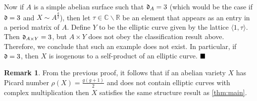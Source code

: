 \documentclass[11pt,leqno]{article}
\theoremstyle{definition}
\newtheorem{remark}{Remark}[section]
\begin{document}
Now if $A$ is a simple abelian surface such that $\frak{d}_A=3$ (which would be the case if $\frak{d}=3$ and $X\sim A^{\frac{g}{2}}$), then let $\tau\in\mathbb{C}\backslash\mathbb{R}$ be an element that appears as an entry in a period matrix of $A$. Define $Y$ to be the elliptic curve given by the lattice $\langle 1,\tau\rangle$. Then $\frak{d}_{A\times Y}=3$, but $A\times Y$ does not obey the classification result above. Therefore, we conclude that such an example does not exist. In particular, if $\frak{d}=3$, then $X$ is isogenous to a self-product of an elliptic curve.
$\hfill \blacksquare$\\

\begin{remark}
From the previous proof, it follows that if an abelian variety $X$ has Picard number $\rho(X)=\frac{g(g+1)}{2}$ and does not contain elliptic curves with complex multiplication then $X$ satisfies the same structure result as \cref{thm:main}.
\end{remark}






%

%


%


\bigskip











%






\end{document}
